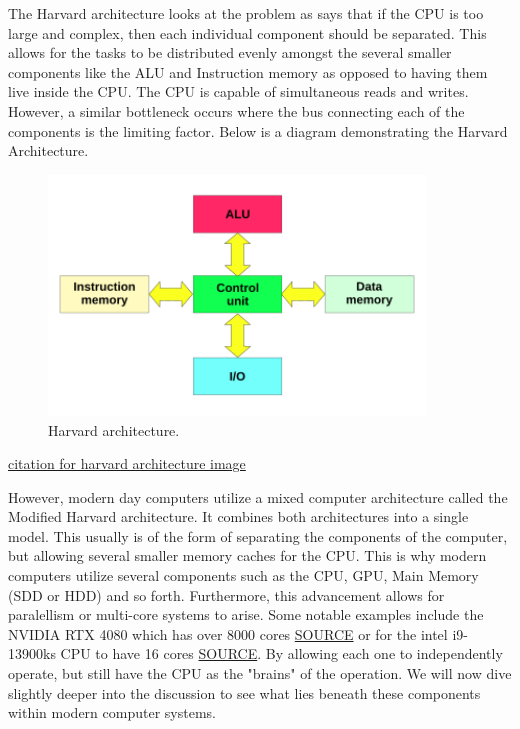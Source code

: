 The Harvard architecture looks at the problem as says that if the CPU is too large and complex, then each individual component should be separated.
This allows for the tasks to be distributed evenly amongst the several smaller components like the ALU and Instruction memory as opposed to having them live inside the CPU.
The CPU is capable of simultaneous reads and writes.
However, a similar bottleneck occurs where the bus connecting each of the components is the limiting factor.
Below is a diagram demonstrating the Harvard Architecture.

\begin{figure}[htb]
    \centering
    \includegraphics[width=10cm]{Images/Harvard_architecture.svg.png}
       \caption{Harvard architecture.}
           \label{Fig:HarvardArch}
\end{figure}

\href{https://commons.wikimedia.org/wiki/File:Harvard_architecture.svg}{citation for harvard architecture image}

However, modern day computers utilize a mixed computer architecture called the Modified Harvard architecture.
It combines both architectures into a single model.
This usually is of the form of separating the components of the computer, but allowing several smaller memory caches for the CPU.
This is why modern computers utilize several components such as the CPU, GPU, Main Memory (SDD or HDD) and so forth.
Furthermore, this advancement allows for paralellism or multi-core systems to arise.
Some notable examples include the NVIDIA RTX 4080 which has over 8000 cores \href{https://www.techpowerup.com/gpu-specs/geforce-rtx-4080.c3888}{SOURCE} or for the intel i9-13900ks CPU to have 16 cores \href{https://www.intel.com/content/www/us/en/products/sku/232167/intel-core-i913900ks-processor-36m-cache-up-to-6-00-ghz/specifications.html}{SOURCE}.
By allowing each one to independently operate, but still have the CPU as the "brains" of the operation.
We will now dive slightly deeper into the discussion to see what lies beneath these components within modern computer systems.


